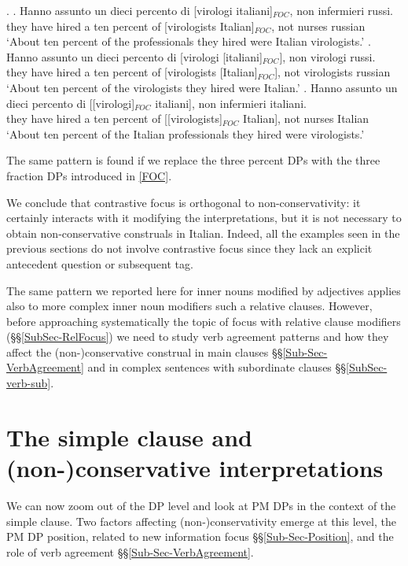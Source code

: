 \documentclass[charis, linguex]{glossa}
\begin{document}
\ex. \label{virologitaliani} \ag.  Hanno assunto un dieci percento di [virologi italiani]$_{FOC}$, non infermieri russi. \\
	  {they have} hired a ten percent of [virologists Italian]$_{FOC}$, not nurses russian \\
	\glt   `About ten percent of the professionals they hired were Italian virologists.' \label{percdonne}		
\bg. Hanno assunto un dieci percento di [virologi [italiani]$_{FOC}$], non virologi russi. \\ 
	  {they have} hired a ten percent of [virologists [Italian]$_{FOC}$], not virologists russian \\
	\glt   `About ten percent of the virologists they hired were Italian.'  \label{percitaliane}	
\cg. Hanno assunto un dieci percento di [[virologi]$_{FOC}$ italiani], non infermieri italiani. \\ 
	  {they have} hired a ten percent of [[virologists]$_{FOC}$ Italian], not nurses Italian \\
	\glt   `About ten percent of the Italian professionals they hired were virologists.'  \label{percivirologi}
	
The same pattern is found if we replace the three percent DPs with the three fraction DPs introduced in \ref{FOC}. 

	
We conclude that contrastive focus is orthogonal to non-conservativity: it certainly interacts with it modifying the interpretations, but it is not necessary to obtain non-conservative construals in Italian. Indeed, all the examples seen in the previous sections do not involve contrastive focus since they lack an explicit antecedent question or subsequent tag.  

The same pattern we reported here for inner nouns modified by adjectives applies also to more complex inner noun modifiers such a relative clauses. However, before approaching systematically the topic of focus with relative clause modifiers (\S\S\ref{SubSec-RelFocus}) we need to study verb agreement patterns and how they affect the (non-)conservative construal in main clauses \S\S\ref{Sub-Sec-VerbAgreement} and in complex sentences with subordinate clauses \S\S\ref{SubSec-verb-sub}. 


\section{The simple clause and (non-)conservative interpretations}\label{Sec-Clause}

We can now zoom out of the DP level and look at PM DPs in the context of the
simple clause. Two factors affecting (non-)conservativity emerge at this level,
the PM DP position, related to new information focus
\S\S\ref{Sub-Sec-Position}, and the role of verb agreement
\S\S\ref{Sub-Sec-VerbAgreement}.
\end{document}
